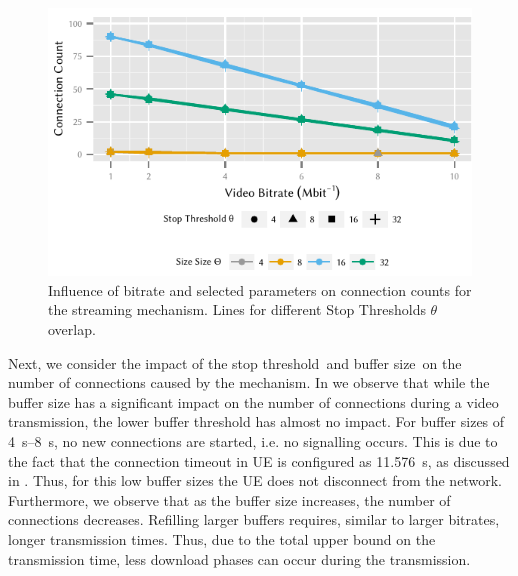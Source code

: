 \begin{figure}
  \centering
  \includegraphics{application/lte_video/numerical_evaluation/figures/bitrate2connections_parameters}
  \caption{Influence of bitrate and selected parameters on connection counts for the streaming mechanism. Lines for different Stop Thresholds \(\theta\) overlap.}
  \label{fig:application:lte_video:numerical_evaluation:energy_consumption:bitrate2connections_parameters}
\end{figure}

Next, we consider the impact of the stop threshold~\bufferlower and buffer size~\buffersize on the number of connections \connectioncount caused by the \streaming mechanism.
In  we observe that while the buffer size has a significant impact on the number of connections during a video transmission, the lower buffer threshold has almost no impact.
For buffer sizes of \SIrange{4}{8}{\second}, no new connections are started, i.e. no signalling occurs.
This is due to the fact that the connection timeout in \gls{UE} is configured as \SI{11.576}{\second}, as discussed in .
Thus, for this low buffer sizes the \gls{UE} does not disconnect from the network.
Furthermore, we observe that as the buffer size increases, the number of connections decreases.
Refilling larger buffers requires, similar to larger bitrates, longer transmission times.
Thus, due to the total upper bound on the transmission time, less download phases can occur during the transmission.